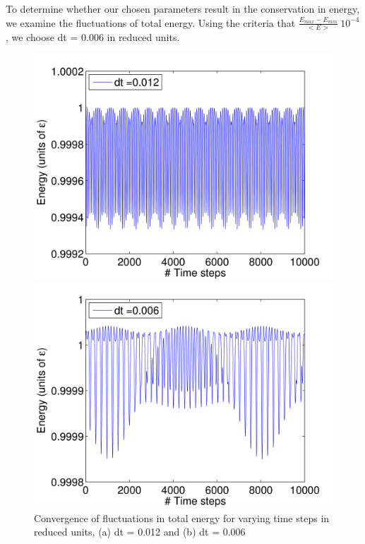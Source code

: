 \documentclass[12pt, oneside]{article}
\begin{document}
To determine whether our chosen parameters result in the conservation in energy, we examine the fluctuations of total energy. Using the criteria that $\frac{E_{max}-E_{min}}{<E>} ~ 10^{-4} $, we choose dt = 0.006 in reduced units. 

\begin{figure}
\begin{minipage}[!htbp]{.49\linewidth}
\includegraphics[width=\textwidth]{./figs/ex1a-1.png}
\end{minipage}
\begin{minipage}[!htbp]{.49\linewidth}
\includegraphics[width=\textwidth]{./figs/ex1a-2.png}
\end{minipage}
\caption{Convergence of fluctuations in total energy for varying time steps in reduced units, (a) dt = 0.012 and (b) dt = 0.006}
\label{fig:atomdt}
\end{figure}
\end{document}
